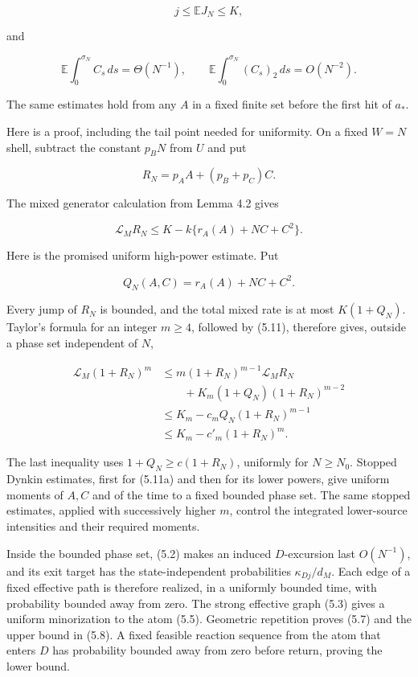 \[
 j\le\mathbb EJ_N\le K,
\tag{5.8}
\]

and

\[
 \mathbb E\int_0^{\sigma_N}C_s\,ds=\Theta(N^{-1}),
 \qquad
 \mathbb E\int_0^{\sigma_N}(C_s)_2\,ds=O(N^{-2}).
\tag{5.9}
\]

The same estimates hold from any \(A\) in a fixed finite set before the
first hit of \(a_*\).

Here is a proof, including the tail point needed for uniformity. On a
fixed \(W=N\) shell, subtract the constant \(p_BN\) from \(U\) and put

\[
 R_N=p_AA+(p_B+p_C)C.
\tag{5.10}
\]

The mixed generator calculation from Lemma 4.2 gives

\[
 \mathcal L_MR_N
 \le K-k\{r_A(A)+NC+C^2\}.
\tag{5.11}
\]

Here is the promised uniform high-power estimate. Put

\[
 Q_N(A,C)=r_A(A)+NC+C^2.
\]

Every jump of \(R_N\) is bounded, and the total mixed rate is at most
\(K(1+Q_N)\). Taylor's formula for an integer \(m\ge4\), followed by
(5.11), therefore gives, outside a phase set independent of \(N\),

\[
\begin{split}
 \mathcal L_M(1+R_N)^m
 &\le m(1+R_N)^{m-1}\mathcal L_MR_N\\
 &\qquad+K_m(1+Q_N)(1+R_N)^{m-2}\\
 &\le K_m-c_m Q_N(1+R_N)^{m-1}\\
 &\le K_m-c'_m(1+R_N)^m .
\end{split}
\tag{5.11a}
\]

The last inequality uses \(1+Q_N\ge c(1+R_N)\), uniformly for
\(N\ge N_0\). Stopped Dynkin estimates, first for (5.11a) and then for
its lower powers, give uniform moments of \(A,C\) and of the time to a
fixed bounded phase set. The same stopped estimates, applied with
successively higher \(m\), control the integrated lower-source
intensities and their required moments.

Inside the bounded phase set, (5.2) makes an induced \(D\)-excursion
last \(O(N^{-1})\), and its exit target has the state-independent
probabilities \(\kappa_{Dj}/d_M\). Each edge of a fixed effective path
is therefore realized, in a uniformly bounded time, with probability
bounded away from zero. The strong effective graph (5.3) gives a uniform
minorization to the atom (5.5). Geometric repetition proves (5.7) and
the upper bound in (5.8). A fixed feasible reaction sequence from the
atom that enters \(D\) has probability bounded away from zero before
return, proving the lower bound.


